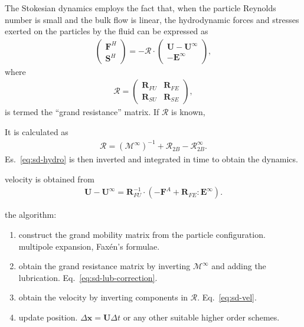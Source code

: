 The Stokesian dynamics \citep{durlofsky_brady_bossis_1987} employs the fact that, when the particle Reynolds number is small and the bulk flow is linear, the hydrodynamic forces and stresses exerted on the particles by the fluid can be expressed as
\begin{equation} 
 \begin{aligned} \label{eq:sd-hydro}
  \begin{pmatrix}
   {\bm F}^H \\
   {\bm S}^H
  \end{pmatrix}
  = - \mathscr{R} \cdot
  \begin{pmatrix}
   {\bm U}-{\bm U}^\infty \\
   -{\bm E}^\infty
  \end{pmatrix},
 \end{aligned}
\end{equation}
where
\begin{equation} 
 \begin{aligned}
  \mathscr{R} =
  \begin{pmatrix}
   {\bm R}_{FU} & {\bm R}_{FE} \\
   {\bm R}_{SU} & {\bm R}_{SE}
  \end{pmatrix},
 \end{aligned}
\end{equation}
is termed the ``grand resistance'' matrix. 
If $\mathscr{R}$ is known, 

It is calculated as
\begin{equation} \label{eq:sd-lub-correction}
 \begin{aligned}
  \mathscr{R} = (\mathscr{M}^\infty)^{-1} +\mathscr{R}_{2B} - \mathscr{R}_{2B}^\infty.
 \end{aligned}
\end{equation}          
Es.\ \eqref{eq:sd-hydro} is then inverted and integrated in time to obtain the dynamics.

velocity is obtained from
\begin{equation} \label{eq:sd-vel}
 \begin{aligned}
  \bm{U - U}^\infty = \bm{R}_{FU}^{-1} \cdot(-\bm{F}^A +\bm{R}_{FE}:\bm{E}^\infty).
 \end{aligned}
\end{equation}        

the algorithm:
\begin{enumerate}
\item construct the grand mobility matrix from the particle configuration. multipole expansion, Fax\'{e}n's formulae.
\item obtain the grand resistance matrix by inverting $\mathscr{M}^\infty$ and adding the lubrication. Eq.\ \eqref{eq:sd-lub-correction}.
\item obtain the velocity by inverting components in $\mathscr{R}$. Eq.\ \eqref{eq:sd-vel}.
\item update position. $\Delta \bm{x}= \bm{U} \Delta t$ or any other suitable higher order schemes.
\end{enumerate}

